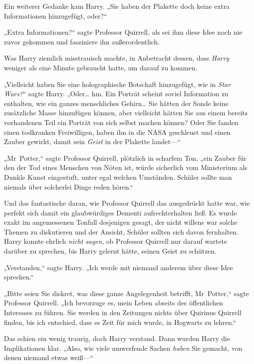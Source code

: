 {Ein weiterer Gedanke kam Harry. „Sie haben der Plakette doch keine extra Informationen hinzugefügt, oder?“

„Extra Informationen?“ sagte Professor Quirrell, als sei ihm diese Idee noch nie zuvor gekommen und fasziniere ihn außerordentlich.

Was Harry ziemlich misstrauisch machte, in Anbetracht dessen, dass \emph{Harry} weniger als eine Minute gebraucht hatte, um darauf zu kommen.

„Vielleicht haben Sie eine holographische Botschaft hinzugefügt, wie in \emph{Star Wars?}“ sagte Harry. „Oder… hm. Ein Porträt scheint soviel Information zu enthalten, wie ein ganzes menschliches Gehirn… Sie hätten der Sonde keine zusätzliche Masse hinzufügen können, aber vielleicht hätten Sie aus einem bereits vorhandenen Teil ein Porträt von sich selbst machen können? Oder Sie fanden einen todkranken Freiwilligen, haben ihn in die NASA geschleust und einen Zauber gewirkt, damit sein \emph{Geist} in der Plakette landet—“

„Mr~Potter,“ sagte Professor Quirrell, plötzlich in scharfem Ton, „ein Zauber für den der Tod eines Menschen von Nöten ist, würde sicherlich vom Ministerium als Dunkle Kunst eingestuft, unter egal welchen Umständen. Schüler sollte man niemals über solcherlei Dinge reden hören.“

Und das fantastische daran, wie Professor Quirrell das ausgedrückt hatte war, wie perfekt sich damit ein glaubwürdiges Dementi aufrechterhalten ließ. Es wurde exakt im angemessenen Tonfall desjenigen gesagt, der nicht willens war solche Themen zu diskutieren und der Ansicht, Schüler sollten sich davon fernhalten. Harry konnte ehrlich \emph{nicht sagen,} ob Professor Quirrell nur darauf wartete darüber zu sprechen, bis Harry gelernt hätte, seinen Geist zu schützen.

„Verstanden,“ sagte Harry. „Ich werde mit niemand anderem über diese Idee sprechen.“

„Bitte seien Sie diskret, was diese ganze Angelegenheit betrifft, Mr~Potter,“ sagte Professor Quirrell. „Ich bevorzuge es, mein Leben abseits des öffentlichen Interesses zu führen. Sie werden in den Zeitungen nichts über Quirinus Quirrell finden, bis ich entschied, dass es Zeit für mich wurde, in Hogwarts zu lehren.“

Das schien ein wenig traurig, doch Harry verstand. Dann wurden Harry die Implikationen klar. „Also, wie viele umwerfende Sachen \emph{haben} Sie gemacht, von denen niemand etwas weiß—“

}
